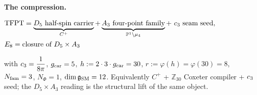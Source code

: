 \par\medskip\noindent\textbf{The compression.}
\begin{keyeq}
$\displaystyle \begin{aligned}
   &\text{TFPT}=\underbrace{D_5\ \text{half-spin carrier}}_{C^+}+\underbrace{A_3\ \text{four-point family}}_{\mathbb P^1\setminus\mu_4}+\ c_3\ \text{seam seed},\\
   &E_8=\text{closure of }D_5\times A_3
  \end{aligned}$
\end{keyeq}
\noindent with $c_3=\dfrac{1}{8\pi}$, $g_{\mathrm{car}}=5$, $h:=2\cdot3\cdot g_{\mathrm{car}}=30$, $r:=\varphi(h)=\varphi(30)=8$,
$N_{\mathrm{fam}}=3$, $N_\Phi=1$, $\dim\mathfrak g_{\mathrm{SM}}=12$. Equivalently $C^+$ + $\mathbb Z_{30}$ Coxeter compiler + $c_3$
seed; the $D_5\times A_3$ reading is the structural lift of the same object.

